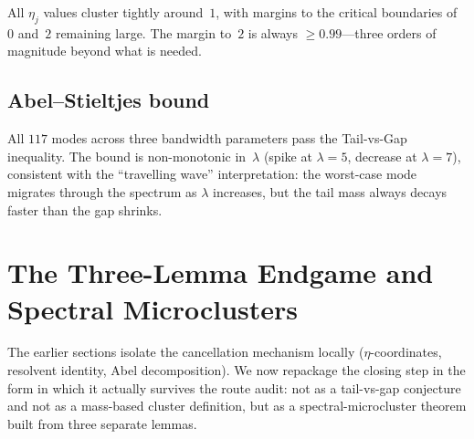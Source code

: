 \documentclass[12pt,a4paper]{article}
\theoremstyle{definition}
\theoremstyle{remark}
\begin{document}
All $\eta_j$ values cluster tightly around~$1$, with margins to
the critical boundaries of~$0$ and~$2$ remaining large.
The margin to~$2$ is always $\geq 0.99$---three orders of magnitude
beyond what is needed.

\subsection{Abel--Stieltjes bound}

\begin{table}[h]
\centering
\caption{Abel--Stieltjes bound and Tail-vs-Gap inequality across all
configurations.}
\label{tab:abel}
\small
{}
\end{table}

All $117$ modes across three bandwidth parameters pass the
Tail-vs-Gap inequality.
The bound is non-monotonic in~$\lambda$ (spike at $\lambda = 5$,
decrease at $\lambda = 7$), consistent with the ``travelling wave''
interpretation: the worst-case mode migrates through the spectrum
as $\lambda$ increases, but the tail mass always decays faster
than the gap shrinks.

\section{The Three-Lemma Endgame and Spectral Microclusters}
\label{sec:endgame}

The earlier sections isolate the cancellation mechanism locally
($\eta$-coordinates, resolvent identity, Abel decomposition).  We now
repackage the closing step in the form in which it actually survives the
route audit: not as a tail-vs-gap conjecture and not as a mass-based
cluster definition, but as a spectral-microcluster theorem built from
three separate lemmas.
\end{document}
